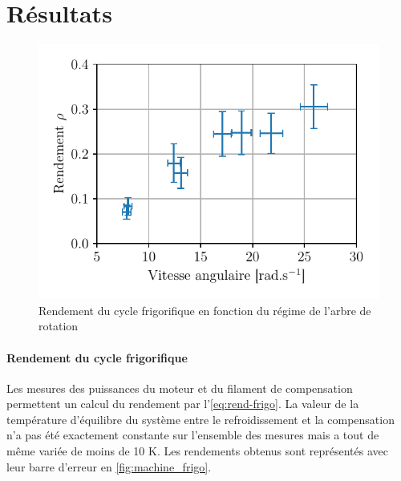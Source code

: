 \section{Résultats}






\begin{minipage}{\linewidth}
    \begin{figure}
        \includegraphics[width=\linewidth]{figures/rend-frigo.pdf}
        \caption{Rendement du cycle frigorifique en fonction du régime de l'arbre de rotation}
        \label{fig:machine_frigo}
    \end{figure}

    \paragraph*{Rendement du cycle frigorifique}
    Les mesures des puissances du moteur et du filament de compensation permettent un calcul du rendement par l'\autoref{eq:rend-frigo}. La valeur de la température d'équilibre du système entre le refroidissement et la compensation n'a pas été exactement constante sur l'ensemble des mesures mais a tout de même variée de moins de 10 \si{\kelvin}. Les rendements obtenus sont représentés avec leur barre d'erreur en \autoref{fig:machine_frigo}.

\end{minipage}

